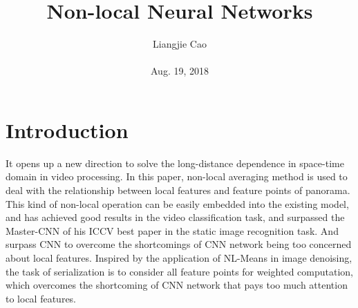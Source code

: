 \documentclass[10pt,twocolumn,letterpaper]{article}
\begin{document}
\title{\textbf{Non-local Neural Networks}}
\author{Liangjie Cao\\\\ Aug. 19, 2018}
\maketitle
\section{Introduction}
It opens up a new direction to solve the long-distance dependence in space-time domain in video processing. In this paper, non-local averaging method is used to deal with the relationship between local features and feature points of panorama. This kind of non-local operation can be easily embedded into the existing model, and has achieved good results in the video classification task, and surpassed the Master-CNN of his ICCV best paper in the static image recognition task. And surpass CNN to overcome the shortcomings of CNN network being too concerned about local features.
Inspired by the application of NL-Means in image denoising, the task of serialization is to consider all feature points for weighted computation, which overcomes the shortcoming of CNN network that pays too much attention to local features.
\end{document}
